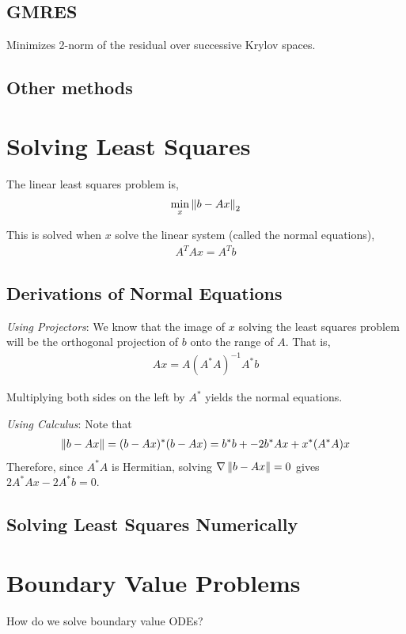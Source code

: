 \documentclass[12pt]{article}
\begin{document}
\subsection{GMRES}
Minimizes 2-norm of the residual over successive Krylov spaces.

\subsection{Other methods}

\pagebreak
\section{Solving Least Squares}
The linear least squares problem is,
\begin{align*}
    \min_{x} \left\lVert b-Ax\right\rVert_2
\end{align*}

This is solved when \( x \) solve the linear system (called the normal equations),
\begin{align*}
    A^TAx = A^Tb
\end{align*}


\subsection{Derivations of Normal Equations}

\textit{Using Projectors}:
We know that the image of \( x \) solving the least squares problem will be the orthogonal projection of \( b \) onto the range of \( A \). That is,
\begin{align*}
    Ax = A(A^*A)^{-1}A^*b
\end{align*}

Multiplying both sides on the left by \( A^* \) yields the normal equations.

\textit{Using Calculus}:
Note that
\begin{align*}
    \left\lVert b-Ax\right\rVert = (b-Ax)^*(b-Ax) = b^*b + -2b^*Ax + x^*(A^*A)x
\end{align*}
Therefore, since \( A^*A \) is Hermitian, solving \( \nabla \left\lVert b-Ax\right\rVert = 0 \) gives \( 2A^*Ax - 2A^*b = 0 \).


\subsection{Solving Least Squares Numerically}

\pagebreak
\section{Boundary Value Problems}
How do we solve boundary value ODEs?
\end{document}
